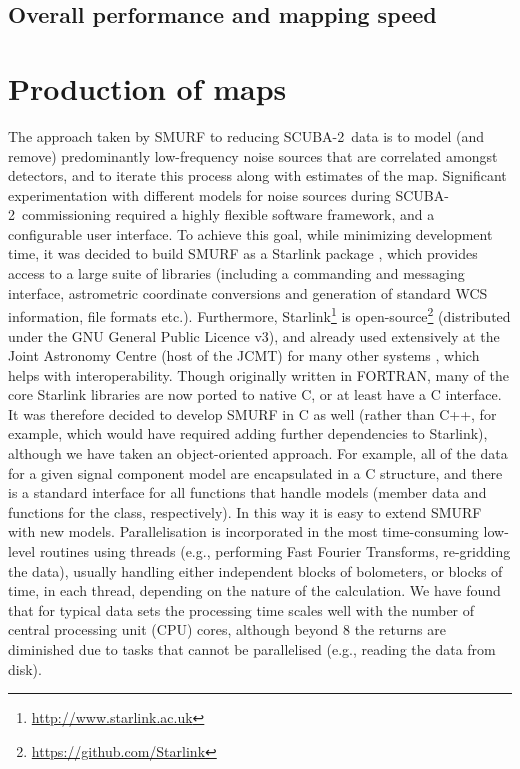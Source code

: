 \documentclass[useAMS,usenatbib,nofootinbib]{mn2e}
\newcommand{\scuba}{SCUBA-2}
\begin{document}
\subsection{Overall performance and mapping speed}



\section{Production of maps}
\label{sec:algorithm}

The approach taken by SMURF to reducing \scuba\ data is to model (and
remove) predominantly low-frequency noise sources that are correlated
amongst detectors, and to iterate this process along with estimates of
the map. Significant experimentation with different models for noise
sources during \scuba\ commissioning required a highly flexible
software framework, and a configurable user interface. To achieve this
goal, while minimizing development time, it was decided to build SMURF
as a Starlink package \citep{2009ASPC..411..418J}, which provides
access to a large suite of libraries (including a commanding and
messaging interface, astrometric coordinate conversions and generation
of standard WCS information, file formats etc.). Furthermore,
Starlink\footnote{\url{http://www.starlink.ac.uk}} is
open-source\footnote{\url{https://github.com/Starlink}} (distributed
under the GNU General Public Licence v3), and already used extensively
at the Joint Astronomy Centre (host of the JCMT) for many other
systems \citep{jenness2011}, which helps with interoperability. Though
originally written in FORTRAN, many of the core Starlink libraries are
now ported to native C, or at least have a C interface. It was
therefore decided to develop SMURF in C as well (rather than C++, for
example, which would have required adding further dependencies to
Starlink), although we have taken an object-oriented approach. For
example, all of the data for a given signal component model are
encapsulated in a C structure, and there is a standard interface for
all functions that handle models (member data and functions for the
class, respectively). In this way it is easy to extend SMURF with new
models. Parallelisation is incorporated in the most time-consuming
low-level routines using threads (e.g., performing Fast Fourier
Transforms, re-gridding the data), usually handling either independent
blocks of bolometers, or blocks of time, in each thread, depending on
the nature of the calculation. We have found that for typical data
sets the processing time scales well with the number of central
processing unit (CPU) cores, although beyond 8 the returns are
diminished due to tasks that cannot be parallelised (e.g., reading the
data from disk).
\end{document}
